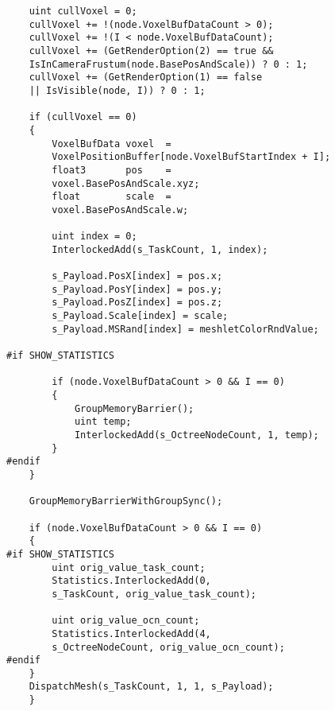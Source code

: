 \begin{lstlisting}
    uint cullVoxel = 0;
    cullVoxel += !(node.VoxelBufDataCount > 0);
    cullVoxel += !(I < node.VoxelBufDataCount);
    cullVoxel += (GetRenderOption(2) == true && 
    IsInCameraFrustum(node.BasePosAndScale)) ? 0 : 1;
    cullVoxel += (GetRenderOption(1) == false 
    || IsVisible(node, I)) ? 0 : 1;
    
    if (cullVoxel == 0)
    {
        VoxelBufData voxel  = 
        VoxelPositionBuffer[node.VoxelBufStartIndex + I];
        float3       pos    = 
        voxel.BasePosAndScale.xyz;
        float        scale  = 
        voxel.BasePosAndScale.w;
        
        uint index = 0;
        InterlockedAdd(s_TaskCount, 1, index);

        s_Payload.PosX[index] = pos.x;
        s_Payload.PosY[index] = pos.y;
        s_Payload.PosZ[index] = pos.z;
        s_Payload.Scale[index] = scale;
        s_Payload.MSRand[index] = meshletColorRndValue;
        
#if SHOW_STATISTICS
        
        if (node.VoxelBufDataCount > 0 && I == 0)
        {
            GroupMemoryBarrier();
            uint temp;
            InterlockedAdd(s_OctreeNodeCount, 1, temp);         
        }
#endif
    }
    
    GroupMemoryBarrierWithGroupSync();

    if (node.VoxelBufDataCount > 0 && I == 0)
    {
#if SHOW_STATISTICS
        uint orig_value_task_count;
        Statistics.InterlockedAdd(0, 
        s_TaskCount, orig_value_task_count);
        
        uint orig_value_ocn_count;
        Statistics.InterlockedAdd(4, 
        s_OctreeNodeCount, orig_value_ocn_count);
#endif
    }    
    DispatchMesh(s_TaskCount, 1, 1, s_Payload);
    }

\end{lstlisting}

